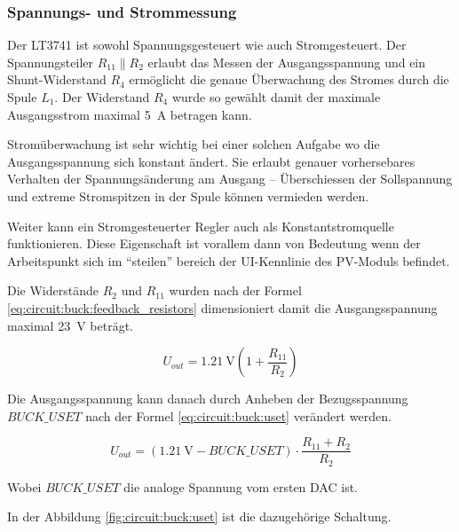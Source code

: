 \subsubsection*{Spannungs- und Strommessung}

Der  LT3741  ist   sowohl   Spannungsgesteuert   wie  auch  Stromgesteuert.  Der
Spannungsteiler $R_{11} \parallel  R_2$  erlaubt das Messen der Ausgangsspannung
und ein Shunt-Widerstand $R_4$ erm\"oglicht die genaue \"Uberwachung des Stromes
durch  die  Spule  $L_1$. Der Widerstand $R_4$  wurde  so  gew\"ahlt  damit  der
maximale Ausgangsstrom maximal \SI{5}{\ampere} betragen kann.

Strom\"uberwachung   ist  sehr  wichtig  bei  einer  solchen  Aufgabe   wo   die
Ausgangsspannung  sich  konstant  \"andert.  Sie erlaubt  genauer  vorhersebares
Verhalten der Spannungs\"anderung am Ausgang -- \"Uberschiessen der Sollspannung
und   extreme   Stromspitzen   in   der   Spule   k\"onnen   vermieden   werden.

Weiter   kann   ein   Stromgesteuerter   Regler  auch  als   Konstantstromquelle
funktionieren. Diese Eigenschaft  ist  vorallem  dann  von  Bedeutung  wenn  der
Arbeitspunkt  sich  im  ``steilen''  bereich  der   UI-Kennlinie  des  PV-Moduls
befindet.

Die   Widerst\"ande   $R_2$   und    $R_{11}$    wurden    nach    der    Formel
\ref{eq:circuit:buck:feedback_resistors}      dimensioniert      damit       die
Ausgangsspannung maximal \SI{23}{\volt} betr\"agt.

\begin{equation}
    U_{out} = \SI{1.21}{\volt} \left( 1 + \frac{R_{11}}{R_2} \right)
    \label{eq:circuit:buck:feedback_resistors}
\end{equation}

Die Ausgangsspannung kann  danach  durch Anheben der Bezugsspannung $BUCK\_USET$
nach der  Formel \ref{eq:circuit:buck:uset} ver\"andert werden. 

\begin{equation}
    U_{out} = (\SI{1.21}{\volt} - BUCK\_USET) \cdot \frac{R_{11} + R_2}{R_2}
    \label{eq:circuit:buck:uset}
\end{equation}

Wobei $BUCK\_USET$ die analoge Spannung vom ersten DAC ist.

In der Abbildung \ref{fig:circuit:buck:uset}  ist  die dazugeh\"orige Schaltung.

